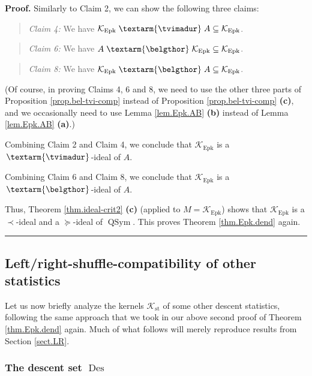 \documentclass[numbers=enddot,12pt,final,onecolumn,notitlepage]{scrartcl}%
\theoremstyle{definition}
\newenvironment{statement}{\begin{quote}}{\end{quote}}
\newenvironment{proof}[1][Proof]{\noindent\textbf{#1.} }{\ \rule{0.5em}{0.5em}}
\newcommand{\tvi}{\left. \textarm{\tvimadur} \right.}
\newcommand{\bel}{\left. \textarm{\belgthor} \right.}
\begin{document}
\begin{proof}
Similarly to Claim 2, we can show the following three claims:

\begin{statement}
\textit{Claim 4:} We have $\mathcal{K}_{\operatorname*{Epk}}\tvi
A\subseteq\mathcal{K}_{\operatorname*{Epk}}$.
\end{statement}

\begin{statement}
\textit{Claim 6:} We have $A\bel\mathcal{K}_{\operatorname*{Epk}}%
\subseteq\mathcal{K}_{\operatorname*{Epk}}$.
\end{statement}

\begin{statement}
\textit{Claim 8:} We have $\mathcal{K}_{\operatorname*{Epk}}\bel
A\subseteq\mathcal{K}_{\operatorname*{Epk}}$.
\end{statement}

(Of course, in proving Claims 4, 6 and 8, we need to use the other three parts
of Proposition \ref{prop.bel-tvi-comp} instead of Proposition
\ref{prop.bel-tvi-comp} \textbf{(c)}, and we occasionally need to use Lemma
\ref{lem.Epk.AB} \textbf{(b)} instead of Lemma \ref{lem.Epk.AB} \textbf{(a)}.)

Combining Claim 2 and Claim 4, we conclude that $\mathcal{K}%
_{\operatorname*{Epk}}$ is a $\tvi$-ideal of $A$.

Combining Claim 6 and Claim 8, we conclude that $\mathcal{K}%
_{\operatorname*{Epk}}$ is a $\bel$-ideal of $A$.

Thus, Theorem \ref{thm.ideal-crit2} \textbf{(c)} (applied to $M=\mathcal{K}%
_{\operatorname*{Epk}}$) shows that $\mathcal{K}_{\operatorname*{Epk}}$ is a
$\left.  \prec\right.  $-ideal and a $\left.  \succeq\right.  $-ideal of
$\operatorname*{QSym}$. This proves Theorem \ref{thm.Epk.dend} again.
\end{proof}

\subsection{\label{subsect.dendri.other-stats}Left/right-shuffle-compatibility
of other statistics}

Let us now briefly analyze the kernels $\mathcal{K}_{\operatorname*{st}}$ of
some other descent statistics, following the same approach that we took in our
above second proof of Theorem \ref{thm.Epk.dend} again. Much of what follows
will merely reproduce results from Section \ref{sect.LR}.

\subsubsection{The descent set $\operatorname*{Des}$}
\end{document}
